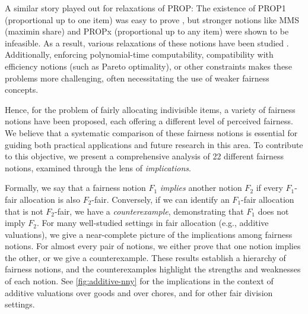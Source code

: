 A similar story played out for relaxations of PROP:
The existence of PROP1\fairDefAgain{} (proportional up to one item) was easy to prove \citep{aziz2021fair},
but stronger notions like MMS\fairDefAgain{} (maximin share) \citep{kurokawa2018fair}
and PROPx\fairDefAgain{} (proportional up to any item) \citep{aziz2020polynomial}
were shown to be infeasible. As a result, various relaxations of these notions have been studied
\citep{kurokawa2018fair,akrami2024breaking,akrami2023randomized,baklanov2021propm,caragiannis2023new,kobayashi2025proportional}.
Additionally, enforcing polynomial-time computability,
compatibility with efficiency notions (such as Pareto optimality),
or other constraints \citep{gourves2014near,bouveret2017fair,biswas2018fair,equbal2024fair}
makes these problems more challenging, often necessitating the use of weaker fairness concepts.

Hence, for the problem of fairly allocating indivisible items, a variety of fairness notions have been proposed,
each offering a different level of perceived fairness.
We believe that a systematic comparison of these fairness notions is essential for
guiding both practical applications and future research in this area.
To contribute to this objective, we present a comprehensive analysis of 22 different fairness notions,
examined through the lens of \emph{implications}.

Formally, we say that a fairness notion $F_1$ \emph{implies} another notion $F_2$ if
every $F_1$-fair allocation is also $F_2$-fair.
Conversely, if we can identify an $F_1$-fair allocation that is not $F_2$-fair,
we have a \emph{counterexample}, demonstrating that $F_1$ does not imply $F_2$.
For many well-studied settings in fair allocation (e.g., additive valuations),
we give a near-complete picture of the implications among fairness notions.
For almost every pair of notions, we either prove that one notion implies the other, or we give a counterexample.
These results establish a hierarchy of fairness notions,
and the counterexamples highlight the strengths and weaknesses of each notion.
See \cref{fig:additive-nny} for the implications in the context of additive valuations over goods and over chores,
and \dagsRef{} for other fair division settings.

